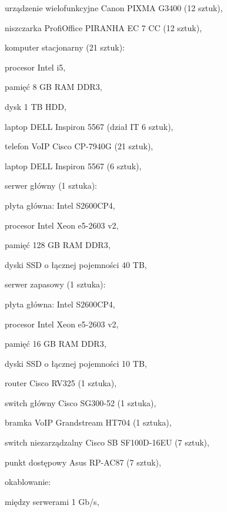 \begin{minipage}[\right]{15cm}
\begin{itemize*}
	\item urządzenie wielofunkcyjne Canon PIXMA G3400 (12 sztuk),
	\item niszczarka ProfiOffice PIRANHA EC 7 CC (12 sztuk),
	\item komputer stacjonarny (21 sztuk):
	\begin{itemize*}
		\item procesor Intel i5,
		\item pamięć 8 GB RAM DDR3,
		\item dysk 1 TB HDD,
	\end{itemize*}
	\item laptop DELL Inspiron 5567 (dział IT 6 sztuk),
	\item telefon VoIP Cisco CP-7940G (21 sztuk),
	\item laptop DELL Inspiron 5567 (6 sztuk),
	\item serwer główny (1 sztuka):
	\begin{itemize*}
		\item płyta główna: Intel S2600CP4,
		\item procesor Intel Xeon e5-2603 v2,
		\item pamięć 128 GB RAM DDR3,
		\item dyski SSD o łącznej pojemności 40 TB, 
	\end{itemize*}
	\item serwer zapasowy (1 sztuka):
	\begin{itemize*}
		\item płyta główna: Intel S2600CP4,
		\item procesor Intel Xeon e5-2603 v2,
		\item pamięć 16 GB RAM DDR3,
		\item dyski SSD o łącznej pojemności 10 TB, 
	\end{itemize*}
	\item router Cisco RV325 (1 sztuka),
	\item switch główny Cisco SG300-52 (1 sztuka),
	\item bramka VoIP Grandstream HT704 (1 sztuka),
	\item switch niezarządzalny Cisco SB SF100D-16EU (7 sztuk),
	\item punkt dostępowy Asus RP-AC87 (7 sztuk),
	\item okablowanie:
	\begin{itemize*}
		\item między serwerami 1 Gb/s,

\end{itemize*}
\end{itemize*}
\end{minipage}
